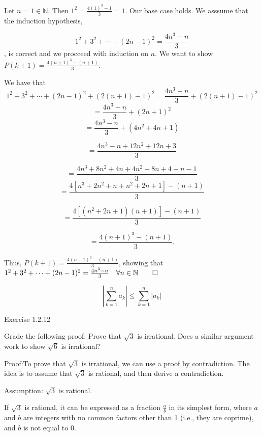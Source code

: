 \documentclass{report}
\begin{document}
\bigskip
{}
\sol

Let $n=1 \in \mathbb{N}$. Then $1^2 =  \frac{4 (1)^{3}-1}{3} = 1$. Our base case holds. We asssume that the induction hypothesis,

$$ 1^{2}+3^{2}+\cdots+(2 n-1)^{2}=\frac{4 n^{3}-n}{3} $$,
is correct and we procceed with induction on $n$. We want to show $P(k+1) = \frac{4 (n+1)^{3}-(n+1)}{3}$.

We have that
$$ 
1^{2}+3^{2}+\cdots+(2 n-1)^{2} +(2 (n+1)-1)^{2}=\frac{4 n^{3}-n}{3} + (2 (n+1)-1)^{2} 
$$  
$$ 
=\frac{4 n^{3}-n}{3} + (2n+1)^{2} 
$$  
$$ 
=\frac{4 n^{3}-n}{3} + (4n^2+4n +1) 
$$  

$$ 
=\frac{4 n^{3}-n+12n^2+12n +3}{3}
$$  


$$ 
=\frac{4 n^{3} + 8n^2 + 4n + 4n^2 + 8n + 4 -n -1}{3}
$$  
$$ 
=\frac{4 [n^{3} + 2n^2 + n + n^2 + 2n + 1] -(n +1)}{3}
$$  

$$ 
=\frac{4 [(n^{2} + 2n + 1)(n+1)] -(n+1)}{3}
$$  


$$ 
=\frac{4 (n+1)^3 -(n+1)}{3}.
$$  

Thus, $P(k+1) = \frac{4 (n+1)^{3}-(n+1)}{3}$, showing that $1^{2}+3^{2}+\cdots+(2 n-1)^{2}=\frac{4 n^{3}-n}{3} \quad \forall n \in \mathbb{N} \qed$  



$$
\left|\sum_{k=1}^{n} a_{k}\right| \leq \sum_{k=1}^{n}\left|a_{k}\right|
$$

\qs{}
{Exercise 1.2.12}

\qs{}
{Grade the following proof: Prove that $\sqrt{3}$ is irrational. Does a similar argument work to show $\sqrt{6}$ is irrational?}

Proof:To prove that $\sqrt{3}$ is irrational, we can use a proof by contradiction. The idea is to assume that $\sqrt{3}$ is rational, and then derive a contradiction.

Assumption: $\sqrt{3}$ is rational.

If $\sqrt{3}$ is rational, it can be expressed as a fraction $\frac{a}{b}$ in its simplest form, where $a$ and $b$ are integers with no common factors other than 1 (i.e., they are coprime), and $b$ is not equal to 0.
\end{document}
